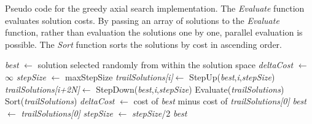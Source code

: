 \documentclass[a4paper, 5p, sort&compress]{elsarticle}%
\begin{document}
\begin{algorithm*}
  \caption{Pseudo code for the greedy axial search implementation. The
    \textit{Evaluate} function evaluates solution costs. By passing an
    array of solutions to the \textit{Evaluate} function, rather than
    evaluation the solutions one by one, parallel evaluation is
    possible. The \textit{Sort} function sorts the solutions by cost
    in ascending order.}
  \label{gasAlgo}
  \begin{algorithmic}
    \State \textit{best} $\gets$ solution selected randomly from within the
    solution space
    \State\textit{deltaCost} $\gets$ $\infty$
    \State\textit{stepSize} $\gets$ maxStepSize
    \State \textit{trailSolutions[i]}$\gets$ StepUp(\textit{best},\textit{i},\textit{stepSize})
    \State \textit{trailSolutions[i+2N]}$\gets$ StepDown(\textit{best},\textit{i},\textit{stepSize})
    \EndFor
    \State Evaluate(\textit{trailSolutions})
    \State Sort(\textit{trailSolutions})
    \State \textit{deltaCost} $\gets$ cost of \textit{best} minus cost of \textit{trailSolutions[0]}
    \State \textit{best} $\gets$ \textit{trailSolutions[0]}
    \EndIf
    \EndWhile
    \State \textit{stepSize} $\gets$ \textit{stepSize}/2
    \EndWhile
    \State \Return \textit{best}
    \EndFunction
  \end{algorithmic}
\end{algorithm*}
\end{document}
